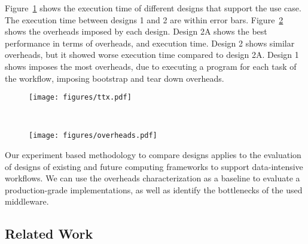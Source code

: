 Figure~\ref{fig:ttx} shows the execution time of different designs that support the use case. 
The execution time between designs 1 and 2 are within error bars.
Figure~\ref{fig:overheads} shows the overheads imposed by each design.
Design 2A shows the best performance in terms of overheads, and execution time.
Design 2 shows similar overheads, but it showed worse execution time compared to design 2A.
Design 1 shows imposes the most overheads, due to executing a program for each task of the workflow, imposing bootstrap and tear down overheads.

\begin{figure*}[ht!]
    \centering
    \begin{subfigure}[b]{0.45\textwidth}
        \texttt{[image: figures/ttx.pdf]}
        \caption{}
        \label{fig:ttx}
    \end{subfigure}%
    ~ 
    \begin{subfigure}[b]{0.45\textwidth}
        \texttt{[image: figures/overheads.pdf]}
        \caption{}
        \label{fig:overheads}
    \end{subfigure}
    \caption{~\ref{fig:ttx} Total execution time of Design~1, 2 and 2.A. Design~1 and 2 have similar performance, Design~2.A is the fastest. ~\ref{fig:overheads} Overheads of Design~1, 2 and 2.A are at least two orders of magnitude less than the total execution time.}\label{fig:overall_performance}
\end{figure*}

Our experiment based methodology to compare designs applies to the evaluation of designs of existing and future computing frameworks to support data-intensive workflows.
We can use the overheads characterization as a baseline to evaluate a production-grade implementations, as well as identify the bottlenecks of the used middleware.


\subsection{Related Work}

